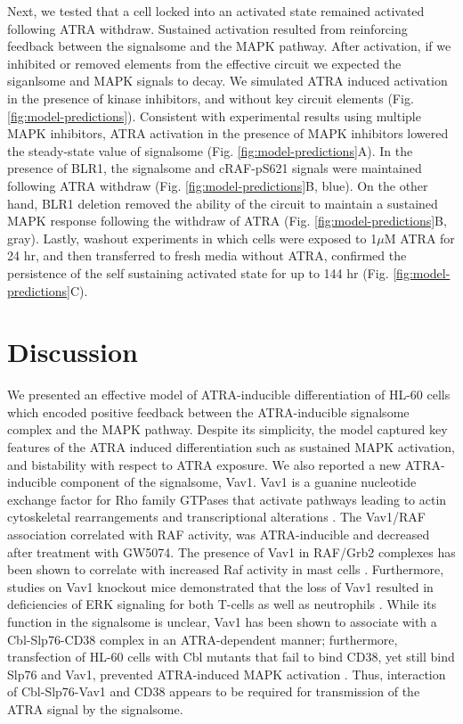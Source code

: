 \documentclass[10pt,twocolumn,twoside,final]{IEEEtran}
\begin{document}
Next, we tested that a cell locked into an activated state remained activated following ATRA withdraw.
Sustained activation resulted from reinforcing feedback between the signalsome and the MAPK pathway.
After activation, if we inhibited or removed elements from the effective circuit we expected the siganlsome and MAPK signals to decay.
We simulated ATRA induced activation in the presence of kinase inhibitors, and without key circuit elements (Fig. \ref{fig:model-predictions}).
Consistent with experimental results using multiple MAPK inhibitors, ATRA activation in the presence of MAPK inhibitors lowered the steady-state value of signalsome (Fig. \ref{fig:model-predictions}A). In the presence of BLR1, the signalsome and cRAF-pS621 signals were maintained following ATRA withdraw (Fig. \ref{fig:model-predictions}B, blue).
On the other hand, BLR1 deletion removed the ability of the circuit to maintain a sustained MAPK response following the withdraw of ATRA (Fig. \ref{fig:model-predictions}B, gray).
Lastly, washout experiments in which cells were exposed to 1$\mu$M ATRA for 24 hr, and then transferred to fresh media without ATRA, confirmed the persistence of the self sustaining activated state for up to 144 hr (Fig. \ref{fig:model-predictions}C).

\section{Discussion}
We presented an effective model of ATRA-inducible differentiation of HL-60 cells which
encoded positive feedback between the ATRA-inducible signalsome complex and the MAPK pathway.
Despite its simplicity, the model captured key features of the ATRA induced differentiation such as
sustained MAPK activation, and bistability with respect to ATRA exposure. We also reported a new ATRA-inducible component of the signalsome, Vav1.
Vav1 is a guanine nucleotide exchange factor for Rho family GTPases that activate pathways leading to actin cytoskeletal rearrangements and transcriptional alterations \cite{Hornstein:2004aa}.
The Vav1/RAF association correlated with RAF activity, was ATRA-inducible and decreased after treatment with GW5074.
The presence of Vav1 in RAF/Grb2 complexes has been shown to correlate with increased Raf activity in mast cells \cite{Song1996}.
Furthermore, studies on Vav1 knockout mice demonstrated that the loss of Vav1 resulted in deficiencies
of ERK signaling for both T-cells as well as neutrophils \cite{Costello1999,Graham2007}.
While its function in the signalsome is unclear, Vav1 has been shown to associate with a Cbl-Slp76-CD38 complex in an ATRA-dependent manner;
furthermore, transfection of HL-60 cells with Cbl mutants that fail to bind CD38, yet still bind Slp76 and Vav1, prevented
ATRA-induced MAPK activation \cite{Shen2009}. Thus, interaction of Cbl-Slp76-Vav1 and CD38 appears to be required for transmission of the ATRA signal by the
signalsome.
\end{document}
